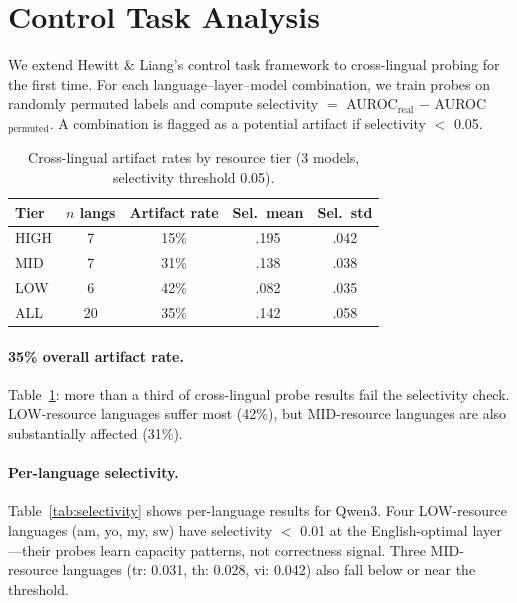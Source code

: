 \documentclass[11pt,a4paper]{article}
\begin{document}
\section{Control Task Analysis}
\label{sec:control}

We extend Hewitt \& Liang's control task framework to cross-lingual probing for the first time.
For each language--layer--model combination, we train probes on randomly permuted labels and compute selectivity $=$ AUROC$_{\text{real}}$ $-$ AUROC$_{\text{permuted}}$.
A combination is flagged as a potential artifact if selectivity $<$ 0.05.

\begin{table}[t]
\centering
\small
\caption{Cross-lingual artifact rates by resource tier (3 models, selectivity threshold 0.05).}
\label{tab:artifact}
\begin{tabular}{lcccc}
\toprule
Tier & $n$ langs & Artifact rate & Sel.\ mean & Sel.\ std \\
\midrule
HIGH & 7 & 15\% & .195 & .042 \\
MID & 7 & 31\% & .138 & .038 \\
LOW & 6 & 42\% & .082 & .035 \\
\midrule
ALL & 20 & 35\% & .142 & .058 \\
\bottomrule
\end{tabular}
\end{table}

\paragraph{35\% overall artifact rate.}
Table~\ref{tab:artifact}: more than a third of cross-lingual probe results fail the selectivity check.
LOW-resource languages suffer most (42\%), but MID-resource languages are also substantially affected (31\%).

\paragraph{Per-language selectivity.}
Table~\ref{tab:selectivity} shows per-language results for Qwen3.
Four LOW-resource languages (am, yo, my, sw) have selectivity $<$ 0.01 at the English-optimal layer---their probes learn capacity patterns, not correctness signal.
Three MID-resource languages (tr: 0.031, th: 0.028, vi: 0.042) also fall below or near the threshold.
\end{document}

